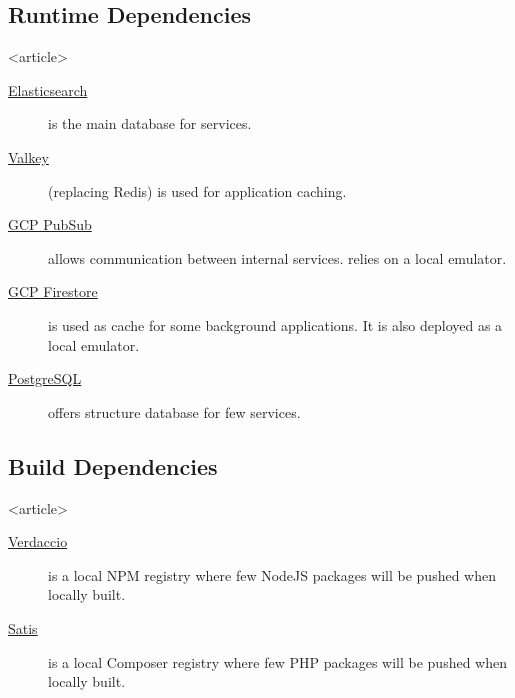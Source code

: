 \subsection<article>{Runtime Dependencies}
\begin{frame}<article>\small
    \begin{description}
        \item[\href{https://www.elastic.co/elasticsearch/}{Elasticsearch}] is the main database for \taoce services.
        \item[\href{https://valkey.io/}{Valkey}] (replacing Redis) is used for application caching.
        \item[\href{https://cloud.google.com/pubsub/docs}{GCP PubSub}] allows communication between internal services. \taoce relies on a local emulator.
        \item[\href{https://cloud.google.com/firestore/docs}{GCP Firestore}] is used as cache for some background applications. It is also deployed as a local emulator.
        \item[\href{https://www.postgresql.org/}{PostgreSQL}] offers structure database for few \taoce services.
    \end{description}
\end{frame}

\subsection<article>{Build Dependencies}
\begin{frame}<article>
    \begin{description}
        \item[\href{https://verdaccio.org/}{Verdaccio}] is a local NPM registry where few NodeJS packages will be pushed when locally built.
        \item[\href{https://github.com/composer/satis}{Satis}] is a local Composer registry where few PHP packages will be pushed when locally built.
    \end{description}
\end{frame}


